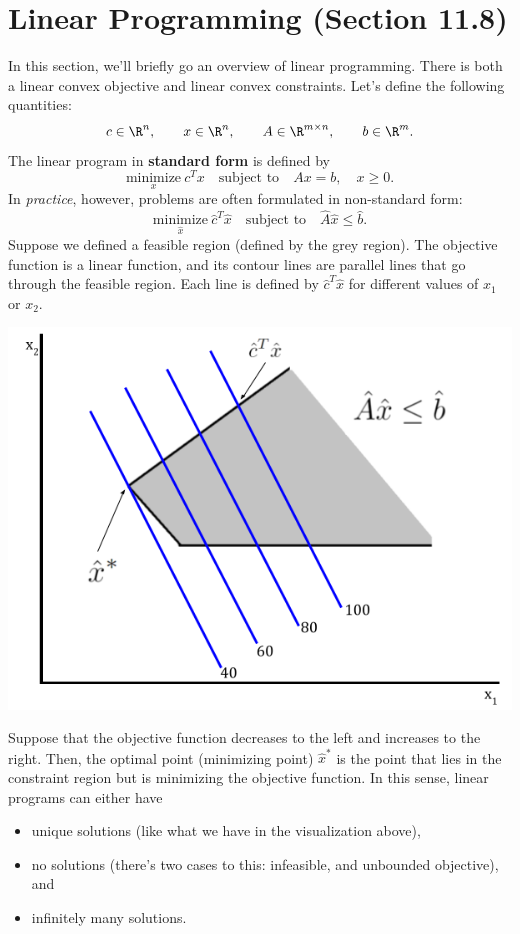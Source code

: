 \documentclass[letterpaper]{article}
\begin{document}
\section{Linear Programming (Section 11.8)}
In this section, we'll briefly go an overview of linear programming. There is both a linear convex objective and linear convex constraints. Let's define the following quantities:
\[c \in \R^n, \qquad x \in \R^n, \qquad A \in \R^{m \times n}, \qquad b \in \R^m.\]
The linear program in \textbf{standard form} is defined by 
\[\underset{x}{\text{minimize}} \ c^T x \quad \text{subject to} \quad Ax = b, \quad x \geq 0.\]
In \emph{practice}, however, problems are often formulated in non-standard form: 
\[\underset{\hat{x}}{\text{minimize}} \ \hat{c}^T \hat{x} \quad \text{subject to} \quad \hat{A} \hat{x} \leq \hat{b}.\]
Suppose we defined a feasible region (defined by the grey region). The objective function is a linear function, and its contour lines are parallel lines that go through the feasible region. Each line is defined by $\hat{c}^T \hat{x}$ for different values of $x_1$ or $x_2$. 
\begin{center}
    \includegraphics[scale=0.45]{../assets/linear_prog_vis.png}
\end{center}
Suppose that the objective function decreases to the left and increases to the right. Then, the optimal point (minimizing point) $\hat{x}^*$ is the point that lies in the constraint region but is minimizing the objective function. In this sense, linear programs can either have 
\begin{itemize}
    \item unique solutions (like what we have in the visualization above),
    \item no solutions (there's two cases to this: infeasible, and unbounded objective), and 
    \item infinitely many solutions. 
\end{itemize}
\end{document}
